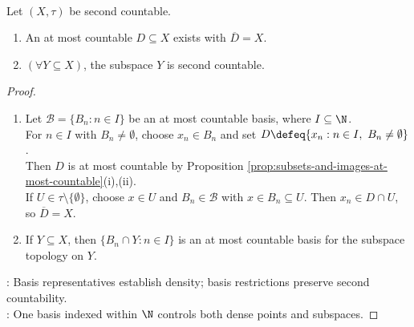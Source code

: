 \begin{proposition} \label{prop:second-countable-implies-separable} \\
Let $(X,\tau)$ be second countable.
\begin{enumerate}[label=(\roman*)]
\setlength{\itemsep}{0pt}
\item An at most countable $D\subseteq X$ exists with $\overline{D}=X$.
\item $(\forall Y\subseteq X)$, the subspace $Y$ is second countable.
\end{enumerate}
\begin{proof}
\begin{enumerate}[label=(\roman*)]
\setlength{\itemsep}{0pt}
\item Let $\mathcal{B}=\{B_n:n\in I\}$ be an at most countable basis, where $I\subseteq\N$.\\
For $n\in I$ with $B_n\neq\emptyset$, choose $x_n\in B_n$ and set $D\defeq\{x_n:n\in I,\ B_n\neq\emptyset\}$.\\
Then $D$ is at most countable by Proposition \ref{prop:subsets-and-images-at-most-countable}(i),(ii).\\
If $U\in\tau\setminus\{\emptyset\}$, choose $x\in U$ and $B_n\in\mathcal{B}$ with $x\in B_n\subseteq U$. Then $x_n\in D\cap U$, so $\overline{D}=X$.
\item If $Y\subseteq X$, then $\{B_n\cap Y:n\in I\}$ is an at most countable basis for the subspace topology on $Y$.
\end{enumerate}
: Basis representatives establish density; basis restrictions preserve second countability.\\
: One basis indexed within $\N$ controls both dense points and subspaces.
\end{proof}
\end{proposition}

